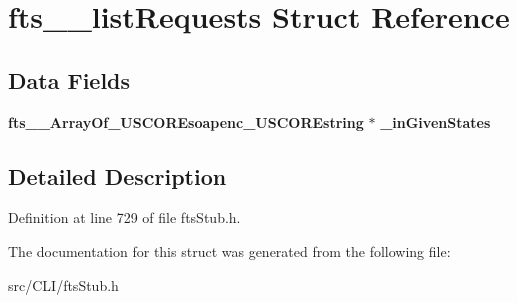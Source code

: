 \section{fts\_\-\_\-listRequests Struct Reference}
\label{structfts____listRequests}
\subsection*{Data Fields}
\begin{DoxyCompactItemize}
\item 
{\bf fts\_\-\_\-ArrayOf\_\-USCOREsoapenc\_\-USCOREstring} $\ast$ {\bfseries \_\-inGivenStates}\label{structfts____listRequests_a3491df3334cd6ab0dc8be174560859dd}

\end{DoxyCompactItemize}


\subsection{Detailed Description}


Definition at line 729 of file ftsStub.h.



The documentation for this struct was generated from the following file:\begin{DoxyCompactItemize}
\item 
src/CLI/ftsStub.h\end{DoxyCompactItemize}
